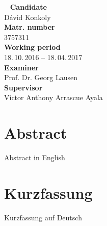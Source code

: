 


%
\newpage
~\vfill
\noindent \textbf{Candidate}\smallskip{}
\\
Dávid Konkoly \smallskip{}
\\
\noindent \textbf{Matr. number}\smallskip{}
\\
3757311 \smallskip{}
\\
\textbf{Working period}\smallskip{}
\\
18.\,10.\,2016 -- 18.\,04.\,2017 \smallskip{}
\\
\textbf{Examiner}\smallskip{}
\\
Prof. Dr. Georg Lausen\smallskip{}
\\
\textbf{Supervisor}\smallskip{}
\\
Victor Anthony Arrascue Ayala\\

\newpage
\chapter*{Abstract}
Abstract in English

\chapter*{Kurzfassung}
Kurzfassung auf Deutsch



\linespread{1.25}\selectfont

\tableofcontents %
\listoffigures  %
\listoftables
\blankpage
\blankpage







\blankpage

\begin{appendices}
	\blankpage
	
\end{appendices}


